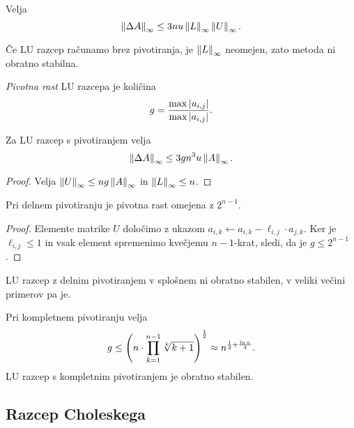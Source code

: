 \begin{posledica}
Velja
\[
\left\lVert \Delta A\right\rVert_\infty \leq 3nu \left\lVert L\right\rVert_\infty \left\lVert U\right\rVert_\infty.
\]
\end{posledica}

\begin{opomba}
Če LU razcep računamo brez pivotiranja, je $\left\lVert L\right\rVert_\infty$
neomejen, zato metoda ni obratno stabilna.
\end{opomba}

\begin{definicija}
\emph{Pivotna rast} LU razcepa je
količina
\[
g = \frac{\max \left\lvert u_{i,j}\right\rvert}{\max \left\lvert a_{i,j}\right\rvert}.
\]
\end{definicija}

\begin{lema}
Za LU razcep s pivotiranjem velja
\[
\left\lVert \Delta A\right\rVert_\infty \leq 3 g n^3 u \left\lVert A\right\rVert_\infty.
\]
\end{lema}

\begin{proof}
Velja $\left\lVert U\right\rVert_\infty \leq n g \left\lVert A\right\rVert_\infty$ in
$\left\lVert L\right\rVert_\infty \leq n$.
\end{proof}

\begin{lema}
Pri delnem pivotiranju je pivotna rast omejena z $2^{n-1}$.
\end{lema}

\begin{proof}
Elemente matrike $U$ določimo z ukazom
$a_{i,k} \gets a_{i,k} - \ell_{i,j} \cdot a_{j,k}$. Ker je
$\ell_{i,j} \leq 1$ in vsak element spremenimo kvečjemu $n-1$-krat,
sledi, da je $g \leq 2^{n-1}$.
\end{proof}

\begin{opomba}
LU razcep z delnim pivotiranjem v splošnem ni obratno stabilen, v
veliki večini primerov pa je.
\end{opomba}

\begin{lema}
Pri kompletnem pivotiranju velja
\[
g \leq
\left(n \cdot \prod_{k=1}^{n-1} \sqrt[k]{k+1}\right)^{\frac{1}{2}} \approx
n^{\frac{1}{2} + \frac{\ln n}{4}}.
\]
LU razcep s kompletnim pivotiranjem je obratno stabilen.
\end{lema}

\newpage

\subsection{Razcep Choleskega}

